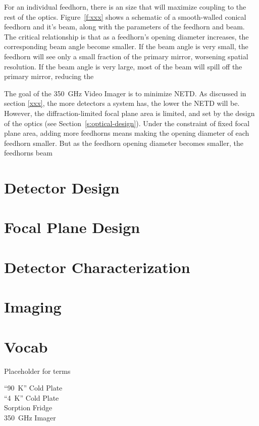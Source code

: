 \documentclass[10pt,twocolumn,article]{memoir}
\newcommand*{\figref}[1]{Figure~\ref{#1}}
\newcommand*{\sectionref}[1]{Section~\ref{#1}}
\newcommand*{\NETD}{{\small NETD}\xspace}
\newcommand*{\Imager}{350~GHz Video Imager\xspace}
\begin{document}
For an individual feedhorn, there is an size that will maximize coupling to the rest of the optics.
\figref{f:xxx} shows a schematic of a smooth-walled conical feedhorn and it's beam, along with the parameters of the feedhorn and beam.
The critical relationship is that as a feedhorn's opening diameter increases, the corresponding beam angle become smaller.
If the beam angle is very small, the feedhorn will see only a small fraction of the primary mirror, worsening spatial resolution.
If the beam angle is very large, most of the beam will spill off the primary mirror, reducing the 
 

The goal of the \Imager is to minimize \NETD.
As discussed in section \ref{xxx}, the more detectors a system has, the lower the \NETD will be.
However, the diffraction-limited focal plane area is limited, and set by the design of the optics (see \sectionref{s:optical-design}).
Under the constraint of fixed focal plane area, adding more feedhorns means making the opening diameter of each feedhorn smaller.
But as the feedhorn opening diameter becomes smaller, the feedhorns beam 
 



\chapter{Detector Design}\label{c:det-design}

\chapter{Focal Plane Design}\label{c:fp-design}

\chapter{Detector Characterization}\label{c:det-char}

\chapter{Imaging}\label{c:imaging}

\chapter{Vocab}

Placeholder for terms

\begin{description}
\item[``90~K'' Cold Plate]
\item[``4~K'' Cold Plate]
\item[Sorption Fridge]
\item[350~GHz Imager]

\end{description}

\printbibliography
\end{document}
